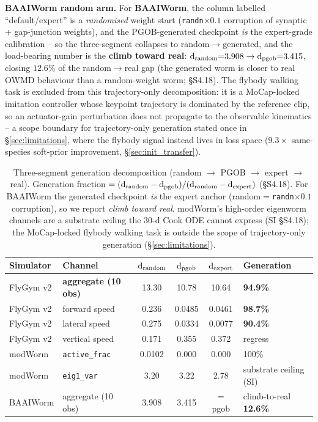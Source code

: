 \documentclass[11pt]{article}
\begin{document}
\textbf{BAAIWorm random arm.} For \textbf{BAAIWorm}, the column labelled ``default/expert'' is a \emph{randomised} weight start (\texttt{randn}$\times0.1$ corruption of synaptic + gap-junction weights), and the PGOB-generated checkpoint \emph{is} the expert-grade calibration -- so the three-segment collapses to random$\to$generated, and the load-bearing number is the \textbf{climb toward real}: $\mathrm{d}_{\rm random}{=}3.908\to\mathrm{d}_{\rm pgob}{=}3.415$, closing \textbf{$12.6\%$} of the random$\to$real gap (the generated worm is closer to real OWMD behaviour than a random-weight worm; \S S4.18). The flybody walking task is excluded from this trajectory-only decomposition: it is a MoCap-locked imitation controller whose keypoint trajectory is dominated by the reference clip, so an actuator-gain perturbation does not propagate to the observable kinematics -- a scope boundary for trajectory-only generation stated once in \S\ref{sec:limitations}, where the flybody signal instead lives in loss space ($9.3\times$ same-species soft-prior improvement, \S\ref{sec:init_transfer}).

\begin{table}[H]
\centering\small
\caption{Three-segment generation decomposition (random $\to$ PGOB $\to$ expert $\to$ real). Generation fraction $=(\mathrm{d}_{\rm random}-\mathrm{d}_{\rm pgob})/(\mathrm{d}_{\rm random}-\mathrm{d}_{\rm expert})$ (\S S4.18). For BAAIWorm the generated checkpoint \emph{is} the expert anchor (random$=$\texttt{randn}$\times0.1$ corruption), so we report \emph{climb toward real}. modWorm's high-order eigenworm channels are a substrate ceiling the $30$-d Cook ODE cannot express (SI \S S4.18); the MoCap-locked flybody walking task is outside the scope of trajectory-only generation (\S\ref{sec:limitations}).}
\label{tab:three_segment}
\begin{tabular}{llcccl}\toprule
Simulator & Channel & $\mathrm{d}_{\rm random}$ & $\mathrm{d}_{\rm pgob}$ & $\mathrm{d}_{\rm expert}$ & Generation \\\midrule
FlyGym v2 & \textbf{aggregate (10 obs)} & 13.30 & 10.78 & 10.64 & \textbf{94.9\%} \\
FlyGym v2 & forward speed & 0.236 & 0.0485 & 0.0461 & \textbf{98.7\%} \\
FlyGym v2 & lateral speed & 0.275 & 0.0334 & 0.0077 & \textbf{90.4\%} \\
FlyGym v2 & vertical speed & 0.171 & 0.355 & 0.372 & regress \\
modWorm   & \texttt{active\_frac} & 0.0102 & 0.000 & 0.000 & 100\% \\
modWorm   & \texttt{eig1\_var} & 3.20 & 3.22 & 2.78 & substrate ceiling (SI) \\
BAAIWorm  & aggregate (10 obs) & 3.908 & 3.415 & $=$pgob & climb-to-real \textbf{12.6\%} \\\bottomrule
\end{tabular}
\end{table}
\end{document}
